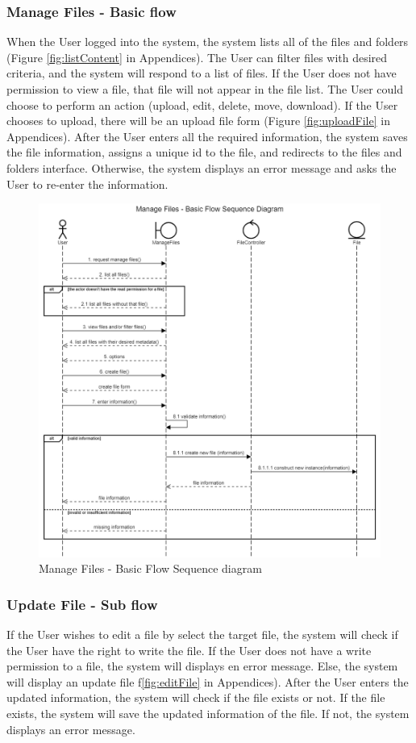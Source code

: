 \subsubsection{Manage Files - Basic flow}
When the User logged into the system, the system lists all of the files and folders (Figure \ref{fig:listContent} in Appendices). The User can filter files with desired criteria, and the system will respond to a list of files. If the User does not have permission to view a file, that file will not appear in the file list. The User could choose to perform an action (upload, edit, delete, move, download). If the User chooses to upload, there will be an upload file form (Figure \ref{fig:uploadFile} in Appendices). After the User enters all the required information, the system saves the file information, assigns a unique id to the file, and redirects to the files and folders interface. Otherwise, the system displays an error message and asks the User to re-enter the information. 
\begin{figure}[H]
    \centering
    \includegraphics[width=1.0\textwidth]{images/Manage Files - Basic Flow Sequence Diagram.png}
    \caption{Manage Files - Basic Flow Sequence diagram}
    \label{fig:SeqFilesBasic}
\end{figure}
\subsubsection{Update File - Sub flow}
If the User wishes to edit a file by select the target file, the system will check if the User have the right to write the file. If the User does not have a write permission to a file, the system will displays en error message. Else, the system will display an update file f\ref{fig:editFile} in Appendices). After the User enters the updated information, the system will check if the file exists or not. If the file exists, the system will save the updated information of the file. If not, the system displays an error message. 

